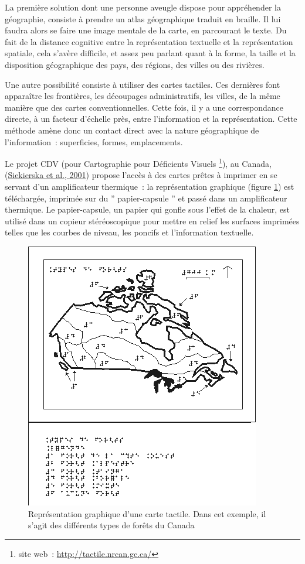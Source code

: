 \documentclass[
]{book}
\begin{document}
La première solution dont une personne aveugle dispose pour appréhender la
géographie, consiste à prendre un atlas géographique traduit en braille. Il
lui faudra alors se faire une image mentale de la carte, en parcourant le
texte. Du fait de la distance cognitive entre la représentation textuelle et
la représentation spatiale, cela s'avère difficile, et assez peu parlant
quant à la forme, la taille et la disposition géographique des pays, des
régions, des villes ou des rivières.

Une autre possibilité consiste à utiliser des cartes tactiles. Ces
dernières font apparaître les frontières, les découpages administratifs, les
villes, de la même manière que des cartes conventionnelles. Cette fois, il y
a une correspondance directe, à un facteur d'échelle près, entre
l'information et la représentation. Cette méthode amène donc un contact
direct avec la nature géographique de l'information~: superficies, formes,
emplacements.

Le projet CDV (pour Cartographie pour Déficients
Visuels \footnote{site web~: \url{http://tactile.nrcan.gc.ca/}}), au Canada,
(\protect\hyperlink{ref-siekierska2001tactile}{Siekierska et al., 2001}) propose l'accès à des cartes prêtes à imprimer
en se servant d'un amplificateur thermique~: la représentation graphique
(figure \ref{fig:canada}) est téléchargée,
imprimée sur du '' papier-capsule '' et passé dans un amplificateur thermique. Le
papier-capsule, un papier qui gonfle sous l'effet de la chaleur, est utilisé
dans un copieur stéréoscopique pour mettre en relief les surfaces imprimées
telles que les courbes de niveau, les poncifs et l'information textuelle.

\begin{figure}
\centering
\includegraphics{img/fo_fr_br.png}
\caption{\label{fig:canada}Représentation graphique
d'une carte tactile. Dans cet exemple, il s'agit des différents types
de forêts du Canada}
\end{figure}
\end{document}
